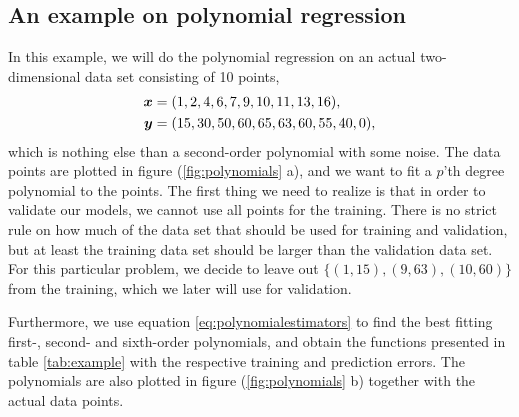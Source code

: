 \subsection{An example on polynomial regression} \label{sec:example}
In this example, we will do the polynomial regression on an actual two-dimensional data set consisting of 10 points,
\begin{equation}
\begin{aligned}
\boldsymbol{{x}}&=(1,2,4,6,7,9,10,11,13,16),\\
\boldsymbol{{y}}&=(15,30,50,60,65,63,60,55,40,0),
\label{eq:datapoints}
\end{aligned}
\end{equation}
which is nothing else than a second-order polynomial with some noise. The data points are plotted in figure (\ref{fig:polynomials} a), and we want to fit a $p$'th degree polynomial to the points. The first thing we need to realize is that in order to validate our models, we cannot use all points for the training. There is no strict rule on how much of the data set that should be used for training and validation, but at least the training data set should be larger than the validation data set. For this particular problem, we decide to leave out $\{(1,15),(9,63),(10,60)\}$ from the training, which we later will use for validation.

Furthermore, we use equation \eqref{eq:polynomialestimators} to find the best fitting first-, second- and sixth-order polynomials, and obtain the functions presented in table \eqref{tab:example} with the respective training and prediction errors. The polynomials are also plotted in figure (\ref{fig:polynomials} b) together with the actual data points.

